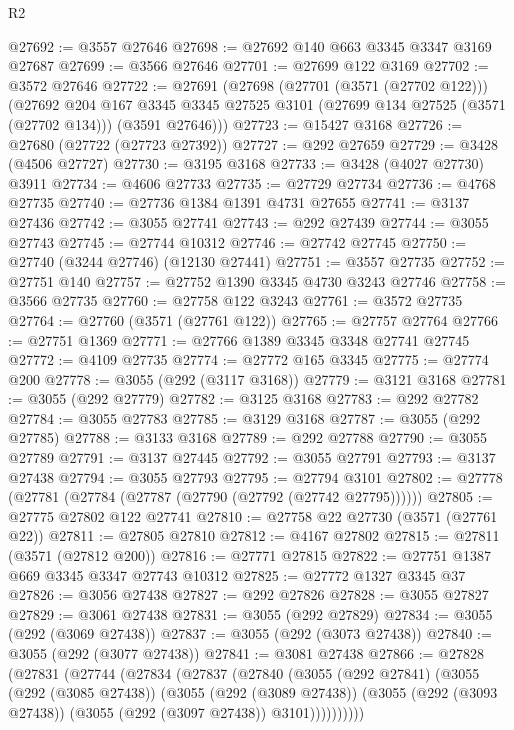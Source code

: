 \begin{lexlean}{R2}
\begin{coremodule}
@27692 := @3557 @27646
@27698 := @27692 @140 @663 @3345 @3347 @3169 @27687
@27699 := @3566 @27646
@27701 := @27699 @122 @3169
@27702 := @3572 @27646
@27722 := @27691
    (@27698
      (@27701 (@3571 (@27702 @122)))
      (@27692
        @204
        @167
        @3345
        @3345
        @27525
        @3101
        (@27699 @134 @27525 (@3571 (@27702 @134)))
        (@3591 @27646)))
@27723 := @15427 @3168
@27726 := @27680 (@27722 (@27723 @27392))
@27727 := @292 @27659
@27729 := @3428 (@4506 @27727)
@27730 := @3195 @3168
@27733 := @3428 (@4027 @27730) @3911
@27734 := @4606 @27733
@27735 := @27729 @27734
@27736 := @4768 @27735
@27740 := @27736 @1384 @1391 @4731 @27655
@27741 := @3137 @27436
@27742 := @3055 @27741
@27743 := @292 @27439
@27744 := @3055 @27743
@27745 := @27744 @10312
@27746 := @27742 @27745
@27750 := @27740 (@3244 @27746) (@12130 @27441)
@27751 := @3557 @27735
@27752 := @27751 @140
@27757 := @27752 @1390 @3345 @4730 @3243 @27746
@27758 := @3566 @27735
@27760 := @27758 @122 @3243
@27761 := @3572 @27735
@27764 := @27760 (@3571 (@27761 @122))
@27765 := @27757 @27764
@27766 := @27751 @1369
@27771 := @27766 @1389 @3345 @3348 @27741 @27745
@27772 := @4109 @27735
@27774 := @27772 @165 @3345
@27775 := @27774 @200
@27778 := @3055 (@292 (@3117 @3168))
@27779 := @3121 @3168
@27781 := @3055 (@292 @27779)
@27782 := @3125 @3168
@27783 := @292 @27782
@27784 := @3055 @27783
@27785 := @3129 @3168
@27787 := @3055 (@292 @27785)
@27788 := @3133 @3168
@27789 := @292 @27788
@27790 := @3055 @27789
@27791 := @3137 @27445
@27792 := @3055 @27791
@27793 := @3137 @27438
@27794 := @3055 @27793
@27795 := @27794 @3101
@27802 := @27778 (@27781 (@27784 (@27787 (@27790 (@27792 (@27742 @27795))))))
@27805 := @27775 @27802 @122 @27741
@27810 := @27758 @22 @27730 (@3571 (@27761 @22))
@27811 := @27805 @27810
@27812 := @4167 @27802
@27815 := @27811 (@3571 (@27812 @200))
@27816 := @27771 @27815
@27822 := @27751 @1387 @669 @3345 @3347 @27743 @10312
@27825 := @27772 @1327 @3345 @37
@27826 := @3056 @27438
@27827 := @292 @27826
@27828 := @3055 @27827
@27829 := @3061 @27438
@27831 := @3055 (@292 @27829)
@27834 := @3055 (@292 (@3069 @27438))
@27837 := @3055 (@292 (@3073 @27438))
@27840 := @3055 (@292 (@3077 @27438))
@27841 := @3081 @27438
@27866 := @27828
    (@27831
      (@27744
        (@27834
          (@27837
            (@27840
              (@3055
                (@292 @27841)
                (@3055
                  (@292 (@3085 @27438))
                  (@3055
                    (@292 (@3089 @27438))
                    (@3055 (@292 (@3093 @27438)) (@3055 (@292 (@3097 @27438)) @3101))))))))))

\end{coremodule}
\end{lexlean}
